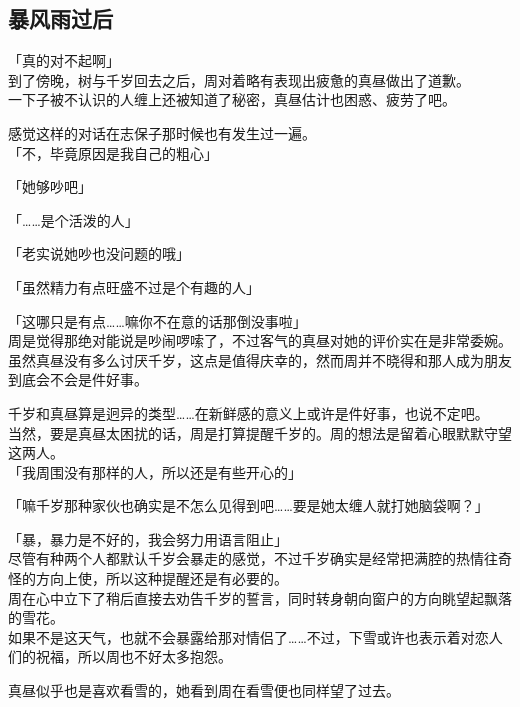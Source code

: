 \subsection{暴风雨过后}

「真的对不起啊」\\

到了傍晚，树与千岁回去之后，周对着略有表现出疲惫的真昼做出了道歉。\\

一下子被不认识的人缠上还被知道了秘密，真昼估计也困惑、疲劳了吧。

感觉这样的对话在志保子那时候也有发生过一遍。\\

「不，毕竟原因是我自己的粗心」

「她够吵吧」

「……是个活泼的人」

「老实说她吵也没问题的哦」

「虽然精力有点旺盛不过是个有趣的人」

「这哪只是有点……嘛你不在意的话那倒没事啦」\\

周是觉得那绝对能说是吵闹啰嗦了，不过客气的真昼对她的评价实在是非常委婉。\\

虽然真昼没有多么讨厌千岁，这点是值得庆幸的，然而周并不晓得和那人成为朋友到底会不会是件好事。

千岁和真昼算是迥异的类型……在新鲜感的意义上或许是件好事，也说不定吧。\\

当然，要是真昼太困扰的话，周是打算提醒千岁的。周的想法是留着心眼默默守望这两人。\\

「我周围没有那样的人，所以还是有些开心的」

「嘛千岁那种家伙也确实是不怎么见得到吧……要是她太缠人就打她脑袋啊？」

「暴，暴力是不好的，我会努力用语言阻止」\\

尽管有种两个人都默认千岁会暴走的感觉，不过千岁确实是经常把满腔的热情往奇怪的方向上使，所以这种提醒还是有必要的。\\

周在心中立下了稍后直接去劝告千岁的誓言，同时转身朝向窗户的方向眺望起飘落的雪花。\\

如果不是这天气，也就不会暴露给那对情侣了……不过，下雪或许也表示着对恋人们的祝福，所以周也不好太多抱怨。

真昼似乎也是喜欢看雪的，她看到周在看雪便也同样望了过去。\\


